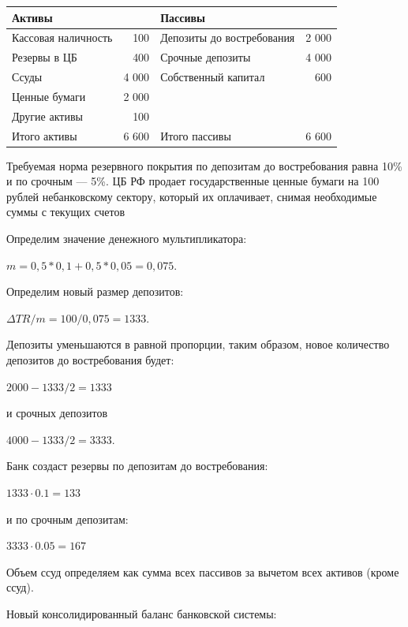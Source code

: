 \documentclass[12pt, table, a4paper,twoside]{exam}
\begin{document}
\begin{questions}
	\begin{tabularx}{\linewidth}[b]{@{}>{\raggedright\arraybackslash}XrXr@{}}
	\toprule
		Активы &       & Пассивы &  \\
		\midrule
		Кассовая наличность & 100   &  Депозиты до востребования & 2 000 \\
		Резервы в ЦБ & 400   &  Срочные депозиты & 4 000 \\
		Ссуды & 4 000  &  Собственный капитал & 600 \\
		Ценные бумаги & 2 000  &       &  \\
		Другие активы & 100   &       &  \\
		\midrule
		Итого активы & 6 600  & Итого пассивы & 6 600 \\
		\bottomrule	
	\end{tabularx}%

Требуемая норма резервного покрытия по депозитам до востребования равна 10\% и по срочным — 5\%.
ЦБ РФ продает государственные ценные бумаги на 100 рублей небанковскому сектору, который их оплачивает, снимая необходимые суммы с текущих счетов

\noaddpoints

\begin{subparts}
	\subpart[15] 
	
	\begin{solution}[12em]
		
		Определим значение денежного мультипликатора:
		
		$m = 0,5 * 0,1 + 0,5 * 0,05 = 0,075.$
		
		Определим новый размер депозитов:
		
		$\Delta TR / m = 100 / 0,075 = 1333.$
		
		Депозиты уменьшаются в равной пропорции, таким образом, новое количество депозитов до востребования будет:
		
		$2000 - 1333/2 = 1333$
		
		и срочных депозитов
		
		$4000 - 1333/2 = 3333.$
		
		Банк создаст резервы по депозитам до востребования:
		
		$1333 \cdot 0.1 = 133$
		
		и по срочным депозитам:
		
		$3333 \cdot 0.05 =  167$
		
		Объем ссуд определяем как сумма всех пассивов за вычетом всех активов (кроме ссуд).
		
		Новый консолидированный баланс банковской системы:		
		

\end{solution}
\end{subparts}
\end{questions}
\end{document}
